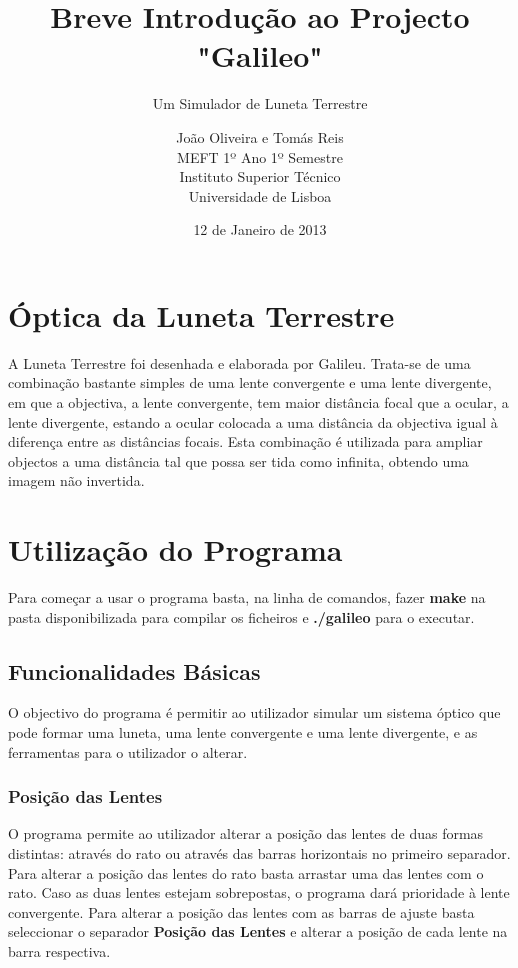 \documentclass{scrartcl}
\begin{document}
\title{\bf Breve Introdução ao Projecto "Galileo"}
\subtitle{Um Simulador de Luneta Terrestre}
\author{João Oliveira e Tomás Reis \\ 
MEFT 1º Ano 1º Semestre \\ 
Instituto Superior Técnico  \\
Universidade de Lisboa\\}
\date{12 de Janeiro de 2013}
\maketitle

\section{Óptica da Luneta Terrestre}
A Luneta Terrestre foi desenhada e elaborada por Galileu. Trata-se de uma combinação bastante simples de uma lente convergente e uma lente divergente, em que a objectiva, a lente convergente, tem maior distância focal que a ocular, a lente divergente, estando a ocular colocada a uma distância da objectiva igual à diferença entre as distâncias focais.
Esta combinação é utilizada para ampliar objectos a uma distância tal que possa ser tida como infinita, obtendo uma imagem não invertida. 
\par
 
\section{Utilização do Programa}

Para começar a usar o programa basta, na linha de comandos, fazer {\bf make} na pasta disponibilizada para compilar os ficheiros e {\bf ./galileo} para o executar.

\subsection{Funcionalidades Básicas}
O objectivo do programa é permitir ao utilizador simular um sistema óptico que pode formar uma luneta, uma lente convergente e uma lente divergente, e as ferramentas para o utilizador o alterar.

\subsubsection{Posição das Lentes}
O programa permite ao utilizador alterar a posição das lentes de duas formas distintas: através do rato ou através das barras horizontais no primeiro separador. Para alterar a posição das lentes do rato basta arrastar uma das lentes com o rato. Caso as duas lentes estejam sobrepostas, o programa dará prioridade à lente convergente. Para alterar a posição das lentes com as barras de ajuste basta seleccionar o separador {\bf Posição das Lentes} e alterar a posição de cada lente na barra respectiva.
\end{document}
